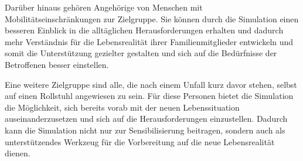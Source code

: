 Darüber hinaus gehören Angehörige von Menschen mit Mobilitätseinschränkungen zur Zielgruppe. Sie können 
durch die Simulation einen besseren Einblick in die alltäglichen Herausforderungen erhalten und dadurch 
mehr Verständnis für die Lebensrealität ihrer Familienmitglieder entwickeln und somit die Unterstützung 
gezielter gestalten und sich auf die Bedürfnisse der Betroffenen besser einstellen.

Eine weitere Zielgruppe sind alle, die nach einem Unfall kurz davor stehen, selbst auf einen Rollstuhl 
angewiesen zu sein. Für diese Personen bietet die Simulation die Möglichkeit, sich bereits vorab mit der 
neuen Lebenssituation auseinanderzusetzen und sich auf die Herausforderungen einzustellen. Dadurch kann 
die Simulation nicht nur zur Sensibilisierung beitragen, sondern auch als unterstützendes Werkzeug für die 
Vorbereitung auf die neue Lebensrealität dienen.

